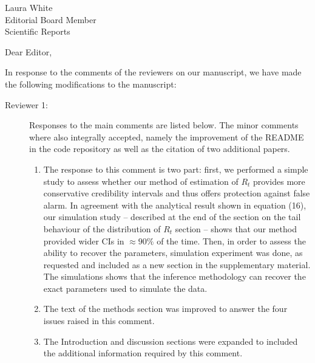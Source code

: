 \documentclass[a4paper,10pt]{letter}
\begin{document}

\begin{letter}{Laura White\\Editorial Board Member\\Scientific Reports }
\address{Escola de Matem\'atica Aplicada\\Funda\c{c}\~ao Getulio Vargas 
(FGV)\\Rio de Janeiro -- RJ\\Brazil.}

\opening{Dear Editor,}

In response to the comments of the reviewers on our manuscript, we have made 
the following modifications to the manuscript:

\begin{description}
 \item[Reviewer 1:] Responses to the main comments are listed below. The minor 
comments where also integrally accepted, namely the  improvement of the README 
in the code repository as well as the citation of two  additional papers. 
 
 \begin{enumerate}
  \item The response to this comment is two part: first, we performed 
a simple study to assess whether our method of estimation of $R_{t}$ provides 
more conservative credibility intervals and thus offers protection against 
false alarm.
In agreement with the analytical result shown in equation (16), 
our simulation study -- described at the end of the section on 
the  tail behaviour of the distribution of $R_t$ section -- shows that our 
method provided wider CIs in $\approx 90\%$ of the time.
Then, in order to assess the ability to recover the parameters, simulation 
experiment was done, as requested and included as a new section in the  
supplementary material. The simulations shows that the inference 
methodology can recover the exact parameters used to simulate  the data.
\item The text of the methods section was improved to answer the four issues 
raised in this comment.
\item The Introduction and discussion sections were expanded to included the 
additional information required by this comment.
 \end{enumerate}


\end{description}
\end{letter}
\end{document}
